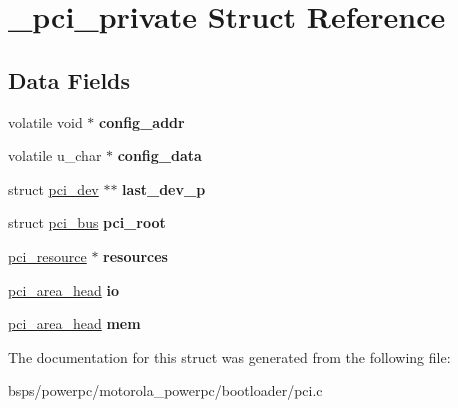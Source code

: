 \hypertarget{struct__pci__private}{}\section{\+\_\+pci\+\_\+private Struct Reference}
\label{struct__pci__private}
\subsection*{Data Fields}
\begin{DoxyCompactItemize}
\item 
\mbox{\label{struct__pci__private_ae84cb6421a22dc4687cc1ed6aab7b326}} 
volatile void $\ast$ {\bfseries config\+\_\+addr}
\item 
\mbox{\label{struct__pci__private_a3691abe73e84e997269e3446dd522010}} 
volatile u\+\_\+char $\ast$ {\bfseries config\+\_\+data}
\item 
\mbox{\label{struct__pci__private_a71d1f2e4314c326d3465be725db3e901}} 
struct \mbox{\hyperlink{structpci__dev}{pci\+\_\+dev}} $\ast$$\ast$ {\bfseries last\+\_\+dev\+\_\+p}
\item 
\mbox{\label{struct__pci__private_a0b70cd42b558b0a42d0cebbd3d0bcada}} 
struct \mbox{\hyperlink{structpci__bus}{pci\+\_\+bus}} {\bfseries pci\+\_\+root}
\item 
\mbox{\label{struct__pci__private_a1a8cacb9038016e7b17b297b0161a7c2}} 
\mbox{\hyperlink{struct__pci__resource}{pci\+\_\+resource}} $\ast$ {\bfseries resources}
\item 
\mbox{\label{struct__pci__private_a0163c342c54def4ee4806640364ed82b}} 
\mbox{\hyperlink{struct__pci__area__head}{pci\+\_\+area\+\_\+head}} {\bfseries io}
\item 
\mbox{\label{struct__pci__private_aa0ef26bf384717f80b49afe3725cf656}} 
\mbox{\hyperlink{struct__pci__area__head}{pci\+\_\+area\+\_\+head}} {\bfseries mem}
\end{DoxyCompactItemize}


The documentation for this struct was generated from the following file\+:\begin{DoxyCompactItemize}
\item 
bsps/powerpc/motorola\+\_\+powerpc/bootloader/pci.\+c\end{DoxyCompactItemize}
